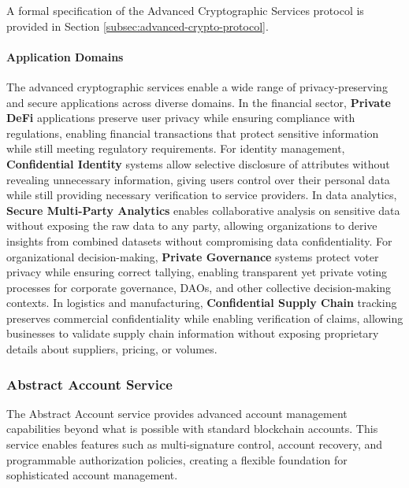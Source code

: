 \documentclass{article}
\begin{document}
A formal specification of the Advanced Cryptographic Services protocol is provided in Section \ref{subsec:advanced-crypto-protocol}.



\paragraph{Application Domains}
The advanced cryptographic services enable a wide range of privacy-preserving and secure applications across diverse domains. In the financial sector, \textbf{Private DeFi} applications preserve user privacy while ensuring compliance with regulations, enabling financial transactions that protect sensitive information while still meeting regulatory requirements. For identity management, \textbf{Confidential Identity} systems allow selective disclosure of attributes without revealing unnecessary information, giving users control over their personal data while still providing necessary verification to service providers. In data analytics, \textbf{Secure Multi-Party Analytics} enables collaborative analysis on sensitive data without exposing the raw data to any party, allowing organizations to derive insights from combined datasets without compromising data confidentiality. For organizational decision-making, \textbf{Private Governance} systems protect voter privacy while ensuring correct tallying, enabling transparent yet private voting processes for corporate governance, DAOs, and other collective decision-making contexts. In logistics and manufacturing, \textbf{Confidential Supply Chain} tracking preserves commercial confidentiality while enabling verification of claims, allowing businesses to validate supply chain information without exposing proprietary details about suppliers, pricing, or volumes.

\subsubsection{Abstract Account Service}
\label{subsubsec:abstract-account}

The Abstract Account service provides advanced account management capabilities beyond what is possible with standard blockchain accounts. This service enables features such as multi-signature control, account recovery, and programmable authorization policies, creating a flexible foundation for sophisticated account management.


\end{document}
